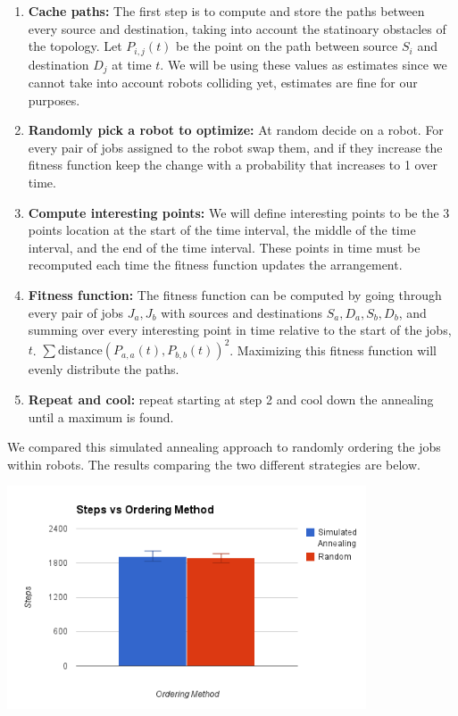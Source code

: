 \documentclass[11pt]{article}
\begin{document}
\begin{enumerate}
\item \textbf{Cache paths:} The first step is to compute and store the paths between every source and destination, taking into account the statinoary obstacles of the topology. Let $P_{i,j}(t)$ be the point on the path between source $S_i$ and destination $D_j$ at time $t$. We will be using these values as estimates since we cannot take into account robots colliding yet, estimates are fine for our purposes.

\item \textbf{Randomly pick a robot to optimize:} At random decide on a robot. For every pair of jobs assigned to the robot swap them, and if they increase the fitness function keep the change with a probability that increases to 1 over time.

\item \textbf{Compute interesting points:} We will define interesting points to be the 3 points location at the start of the time interval, the middle of the time interval, and the end of the time interval. These points in time must be recomputed each time the fitness function updates the arrangement.

\item \textbf{Fitness function:} The fitness function can be computed by going through every pair of jobs $J_a, J_b$ with sources and destinations $S_a, D_a, S_b, D_b$, and summing over every interesting point in time relative to the start of the jobs, $t$. $\displaystyle \sum \text{distance}(P_{a, a}(t), P_{b, b}(t))^2$. Maximizing this fitness function will evenly distribute the paths.

\item \textbf{Repeat and cool:} repeat starting at step 2 and cool down the annealing until a maximum is found.
\end{enumerate}

We compared this simulated annealing approach to randomly ordering the jobs within robots. The results comparing the two different strategies are below.

\begin{center}
\includegraphics[height=250px]{ordering_chart.png}
\end{center}
\end{document}
